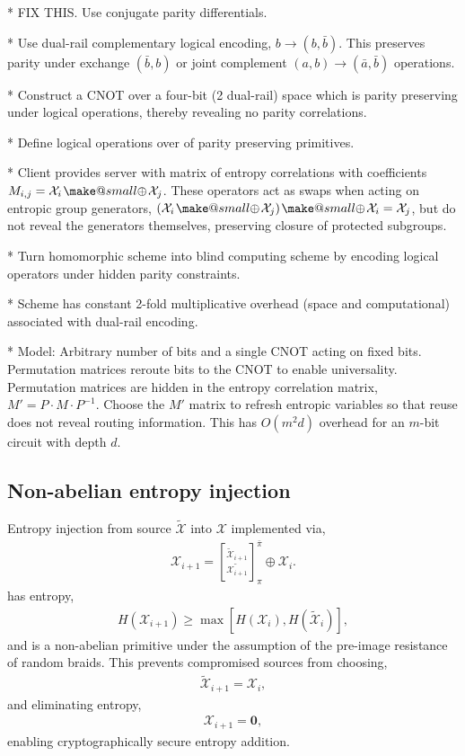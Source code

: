 \documentclass[twocolumn, aps, amsmath, amssymb, nofootinbib, superscriptaddress, longbibliography, doublefloatfix, table-of-contents, eqsecnum, rmp]{revtex4-2}
\makeatletter
\def\zerovec{\mathbf{0}}
\newcommand{\stackbraid}[2]{{\genfrac{[}{]}{0pt}{}{{#1}}{{#2}}}^{\bar{\pi}}_{\pi}}
\newcommand{\soplus}{{{\hspace{1pt}}{\mathbin{\mathpalette\make@small{\mathbin\oplus}}}}{\hspace{1pt}}}
\newcommand{\make@small}[2]{%
  \vcenter{\hbox{%
    \scalebox{0.6}{$\m@th#1#2$}%
  }}%
}
\makeatother
\begin{document}
* FIX THIS. Use conjugate parity differentials.

* Use dual-rail complementary logical encoding, $b\to (b,\bar{b})$. This preserves parity under exchange $(\bar{b},b)$ or joint complement $(a,b)\to(\bar{a},\bar{b})$ operations.

* Construct a CNOT over a four-bit (2 dual-rail) space which is parity preserving under logical operations, thereby revealing no parity correlations.

* Define logical operations over of parity preserving primitives.

* Client provides server with matrix of entropy correlations with coefficients $M_{i,j} = \mathcal{X}_i\soplus \mathcal{X}_j$. These operators act as swaps when acting on entropic group generators, $(\mathcal{X}_i\soplus \mathcal{X}_j) \soplus \mathcal{X}_i = \mathcal{X}_j$, but do not reveal the generators themselves, preserving closure of protected subgroups.

* Turn homomorphic scheme into blind computing scheme by encoding logical operators under hidden parity constraints.

* Scheme has constant 2-fold multiplicative overhead (space and computational) associated with dual-rail encoding.

* Model: Arbitrary number of bits and a single CNOT acting on fixed bits. Permutation matrices reroute bits to the CNOT to enable universality. Permutation matrices are hidden in the entropy correlation matrix, \mbox{$M'=P\cdot M \cdot P^{-1}$}. Choose the $M'$ matrix to refresh entropic variables so that reuse does not reveal routing information. This has $O(m^2 d)$ overhead for an $m$-bit circuit with depth $d$.

\subsection{Non-abelian entropy injection}

Entropy injection from source $\tilde{\mathcal{X}}$ into $\mathcal{X}$ implemented via,
\begin{align}
	\mathcal{X}_{i+1} = \stackbraid{\mathcal{\tilde X}_{i+1}}{\tilde{\mathcal{X}_{i+1}}} \oplus \mathcal{X}_i.
\end{align}
has entropy,
\begin{align}
	H(\mathcal{X}_{i+1}) \geq \max[H(\mathcal{X}_i),H(\tilde{\mathcal{X}}_i)],
\end{align}
and is a non-abelian primitive under the assumption of the pre-image resistance of random braids. This prevents compromised sources from choosing,
\begin{align}
	\tilde{\mathcal{X}}_{i+1}=\mathcal{X}_i,
\end{align}
and eliminating entropy,
\begin{align}
	\mathcal{X}_{i+1} = \zerovec,
\end{align}
enabling cryptographically secure entropy addition.
\end{document}
